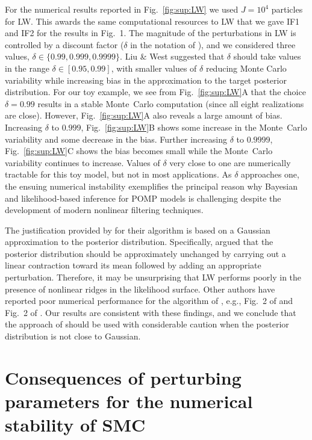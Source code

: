 \documentclass[11pt]{article}
\begin{document}
For the numerical results reported in Fig.~\ref{fig:sup:LW} we used $J=10^4$ particles for LW.
This awards the same computational resources to LW that we gave IF1 and IF2 for the results in Fig.~1.
The magnitude of the perturbations in LW is controlled by a discount factor ($\delta$ in the notation of \cite{janeliu01}), and we considered three values, $\delta\in\{0.99,0.999,0.9999\}$.
Liu \& West \cite{janeliu01} suggested that $\delta$ should take values in the range $\delta\in[0.95,0.99]$, with smaller values of $\delta$ reducing Monte Carlo variability while increasing bias in the approximation to the target posterior distribution.
For our toy example, we see from Fig.~\ref{fig:sup:LW}A that the choice $\delta=0.99$ results in a stable Monte~Carlo computation (since all eight realizations are close).
However, Fig.~\ref{fig:sup:LW}A also reveals a large amount of bias.
Increasing $\delta$ to $0.999$, Fig.~\ref{fig:sup:LW}B shows some increase in the Monte~Carlo variability and some decrease in the bias.
Further increasing $\delta$ to $0.9999$, Fig.~\ref{fig:sup:LW}C shows the bias becomes small while the Monte~Carlo variability continues to increase.
Values of $\delta$ very close to one are numerically tractable for this toy model, but not in most applications. 
As $\delta$ approaches one, the ensuing numerical instability exemplifies the principal reason why Bayesian and likelihood-based inference for POMP models is challenging despite the development of modern nonlinear filtering techniques.

The justification provided by \cite{janeliu01} for their algorithm is based on a Gaussian approximation to the posterior distribution.
Specifically, \cite{janeliu01} argued that the posterior distribution should be approximately unchanged by carrying out a linear contraction toward its mean followed by adding an appropriate perturbation.
Therefore, it may be unsurprising that LW performs poorly in the presence of nonlinear ridges in the likelihood surface. 
Other authors have reported poor numerical performance for the  algorithm of \cite{janeliu01}, e.g., Fig.~2 of \cite{storvik02} and Fig.~2 of \cite{chopin13}. 
Our results are consistent with these findings, and we conclude that the approach of \cite{janeliu01} should be used with considerable caution when the posterior distribution is not close to Gaussian.


\section{Consequences of perturbing parameters for the numerical stability of SMC}
\end{document}
